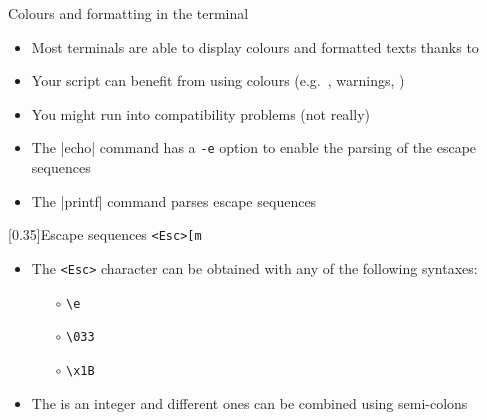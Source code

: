 
\begin{frame}{Colours and formatting in the terminal}{}
    \vspace{-4mm}
    \begin{itemize}
        \item Most terminals are able to display colours and formatted texts thanks to 
        \item Your script can benefit from using colours (e.g.\ , \alert{warnings}, )
        \item You might run into compatibility problems (not really) {\scriptsize $\;$ }
        \item The \bash|echo| command has a \texttt{\alert{-e}} option to enable the parsing of the escape sequences
        \item The \bash|printf| command parses escape sequences
    \end{itemize}
    \vspace{-3mm}
    \begin{varblock}{}[0.35\textwidth]{Escape sequences}
        \texttt{<Esc>[m}
    \end{varblock}
    \begin{itemize}
        \item The \texttt{<Esc>} character can be obtained with any of the following syntaxes:
              \begin{itemize}
                  \item[$\circ$] \texttt{\textbackslash{}e}
                  \item[$\circ$] \texttt{\textbackslash{}033}
                  \item[$\circ$] \texttt{\textbackslash{}x1B}
              \end{itemize}
        \item The \texttt{} is an integer and different ones can be combined using semi-colons
    \end{itemize}
\end{frame}
